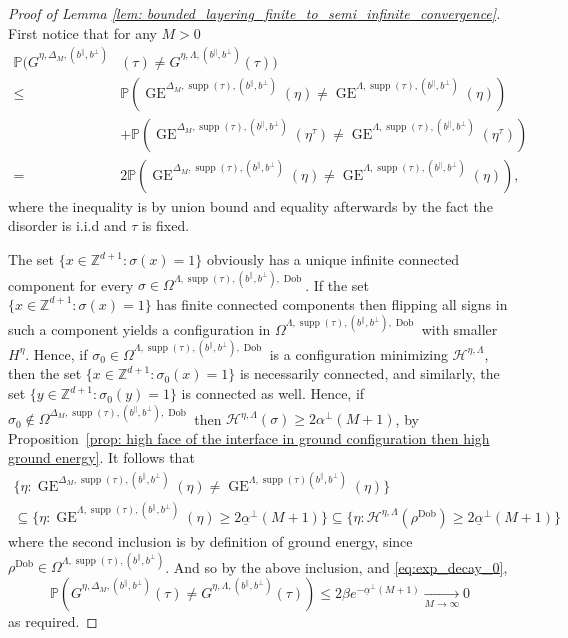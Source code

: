 \documentclass[11pt, reqno]{amsart}
\DeclareMathOperator{\supp}{supp}
\DeclareMathOperator{\Dob}{Dob}
\DeclareMathOperator{\GE}{GE}
\renewcommand{\P}{\mathbb{P}}
\numberwithin{equation}{section}
\begin{document}
\begin{proof}[Proof of Lemma \ref{lem: bounded_layering_finite_to_semi_infinite_convergence}]
First notice that for any $M>0$
\begin{align*}
\P \Big(G^{\eta,\Delta_M, (b^{\parallel},b^{\perp})}&(\tau) \neq G^{\eta,\Lambda,(b^{\parallel},b^{\perp})}(\tau) \Big) \\
\leq &\P \left(\GE^{\Delta_M,\supp(\tau), (b^{\parallel},b^{\perp})}(\eta) \neq \GE^{\Lambda,\supp(\tau), (b^{\parallel},b^{\perp})}(\eta) \right)\\
&+\P \left(\GE^{\Delta_M,\supp(\tau), (b^{\parallel},b^{\perp})}(\eta^{\tau}) \neq \GE^{\Lambda,\supp(\tau), (b^{\parallel},b^{\perp})}(\eta^{\tau}) \right)\\
=& 2\P \left(\GE^{\Delta_M,\supp(\tau), (b^{\parallel},b^{\perp})}(\eta) \neq \GE^{\Lambda,\supp(\tau), (b^{\parallel},b^{\perp})}(\eta) \right),
\end{align*}
where the inequality is by union bound and equality afterwards by the fact the disorder is i.i.d and $\tau$ is fixed.

The set $\{x\in{\mathbb Z}^{d+1}\colon \sigma(x)=1\}$ obviously has a unique infinite connected component for every $\sigma\in\Omega^{\Lambda,\supp(\tau),(b^{\parallel},b^{\perp}),\Dob}$.
If the set $\{x\in{\mathbb Z}^{d+1}\colon \sigma(x)=1\}$ has  finite connected components then 
flipping all signs in such a component yields a configuration in $\Omega^{\Lambda,\supp(\tau),(b^{\parallel},b^{\perp}),\Dob}$
with smaller $H^{\eta}$.
Hence, if $\sigma_0\in\Omega^{\Lambda,\supp(\tau),(b^{\parallel},b^{\perp}),\Dob}$  is a configuration minimizing $\mathcal{H}^{\eta,\Lambda}$, then the set $\{x\in{\mathbb Z}^{d+1}\colon \sigma_0(x)=1\}$ is necessarily connected, and similarly, the set $\{y\in{\mathbb Z}^{d+1}\colon \sigma_0(y)=1\}$ is connected as well. 
Hence, if $\sigma_0\notin\Omega^{\Delta_M,\supp(\tau),(b^{\parallel},b^{\perp}),\Dob}$ then $\mathcal{H}^{\eta,\Lambda}(\sigma ) \geq 2\alpha^{\perp}(M+1)$, by Proposition~\ref{prop: high face of the interface in ground configuration then high ground energy}. It follows that
\begin{multline*}
\{\eta:\GE^{\Delta_M,\supp(\tau), (b^{\parallel},b^{\perp})}(\eta) \neq \GE^{\Lambda,\supp(\tau) (b^{\parallel},b^{\perp})}(\eta) \} \\
\subseteq\{\eta: \GE^{\Lambda,\supp(\tau), (b^{\parallel},b^{\perp})}(\eta) \geq 2\underline{\alpha}^{\perp}  (M+1)\} \subseteq \{\eta: \mathcal{H}^{\eta,\Lambda}(\rho^{\Dob}) \geq 2\underline{\alpha}^{\perp}(M+1) \}
\end{multline*}
where the second inclusion is by definition of ground energy, since $\rho^{\Dob}\in\Omega^{\Lambda,\supp(\tau),(b^{\parallel},b^{\perp})}$.
And so by the above inclusion, and \eqref{eq:exp_decay_0},
\begin{equation*}
\P \left(G^{\eta,\Delta_M, (b^{\parallel},b^{\perp})}(\tau) \neq G^{\eta,\Lambda,(b^{\parallel},b^{\perp})}(\tau) \right) \leq 2\beta e^{- \underline{\alpha}^{\perp}(M+1)} \xrightarrow[M\rightarrow\infty]{}0
\end{equation*}
as required.
\end{proof}
\end{document}
